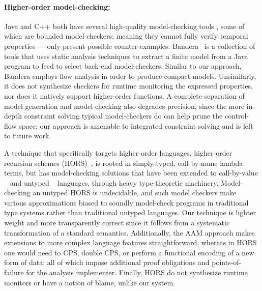 \paragraph{Higher-order model-checking:}
Java and C++ both have several high-quality model-checking tools \citep{ianjohnson:bandera, ianjohnson:java-pathfinder, ianjohnson:LLBMC}, some of which are bounded model-checkers; meaning they cannot fully verify temporal properties --- only present possible counter-examples.
%
Bandera~\citep{ianjohnson:bandera} is a collection of tools that uses static analysis techniques to extract a finite model from a Java program to feed to select back-end model-checkers.
%
Similar to our approach, Bandera employs flow analysis in order to produce compact models.
%
Unsimilarly, it does not synthesize checkers for runtime monitoring the expressed properties, nor does it natively support higher-order functions.
%
A complete separation of model generation and model-checking also degrades precision, since the more in-depth constraint solving typical model-checkers do can help prune the control-flow space; our approach is amenable to integrated constraint solving and is left to future work.

A technique that specifically targets higher-order languages, higher-order recursion schemes (HORS)~\citep{ianjohnson:Knapik:2002:HPT:646794.704852}, is rooted in simply-typed, call-by-name lambda terms, but has model-checking solutions that have been extended to call-by-value ~\citep{ianjohnson:DBLP:journals/jacm/Kobayashi13} and untyped ~\citep{dvanhorn:Tsukada2010Untyped} languages, through heavy type-theoretic machinery.
%
Model-checking an untyped HORS is undecidable, and such model checkers make various approximations biased to soundly model-check programs in traditional type systems rather than traditional untyped languages.
%
Our technique is lighter weight and more transparently correct since it follows from a systematic transformation of a standard semantics.
%
Additionally, the AAM approach makes extensions to more complex language features straightforward, whereas in HORS one would need to CPS, double CPS, or perform a functional encoding of a new form of data; all of which impose additional proof obligations and points-of-failure for the analysis implementer.
%
Finally, HORS do not synthesize runtime monitors or have a notion of blame, unlike our system.

